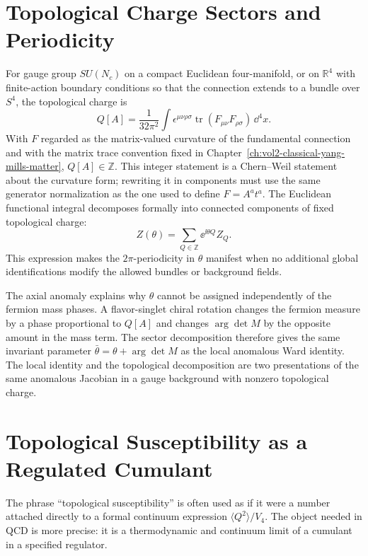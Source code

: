 \section{Topological Charge Sectors and Periodicity}

For gauge group \(SU(N_c)\) on a compact Euclidean four-manifold, or on
\(\mathbb R^4\) with finite-action boundary conditions so that the connection
extends to a bundle over \(S^4\), the topological charge is
\[
  Q[A]
  =
  \frac1{32\pi^2}
  \int
  \epsilon^{\mu\nu\rho\sigma}
  \operatorname{tr}(F_{\mu\nu}F_{\rho\sigma})\,\dd^4x .
\]
With \(F\) regarded as the matrix-valued curvature of the fundamental
connection and with the matrix trace convention fixed in
Chapter~\ref{ch:vol2-classical-yang-mills-matter}, \(Q[A]\in\mathbb Z\).
This integer statement is a Chern--Weil statement about the curvature form;
rewriting it in components must use the same generator normalization as the
one used to define \(F=A^a t^a\).  The Euclidean functional integral
decomposes formally into connected components of fixed topological charge:
\[
  Z(\theta)
  =
  \sum_{Q\in\mathbb Z}
  \ee^{\ii\theta Q}Z_Q .
\]
This expression makes the \(2\pi\)-periodicity in \(\theta\) manifest when no
additional global identifications modify the allowed bundles or background
fields.

The axial anomaly explains why \(\theta\) cannot be assigned independently of
the fermion mass phases.  A flavor-singlet chiral rotation changes the
fermion measure by a phase proportional to \(Q[A]\) and changes
\(\arg\det M\) by the opposite amount in the mass term.  The sector
decomposition therefore gives the same invariant parameter
\(\bar\theta=\theta+\arg\det M\) as the local anomalous Ward identity.  The
local identity and the topological decomposition are two presentations of the
same anomalous Jacobian in a gauge background with nonzero topological charge.

\section{Topological Susceptibility as a Regulated Cumulant}
\label{sec:topological-susceptibility-regulated-cumulant}

The phrase ``topological susceptibility'' is often used as if it were a
number attached directly to a formal continuum expression
\(\langle Q^2\rangle/V_4\).  The object needed in QCD is more precise: it is a
thermodynamic and continuum limit of a cumulant in a specified regulator.

